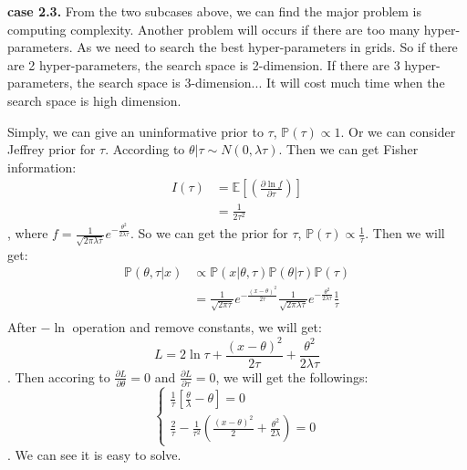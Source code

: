 \documentclass[11pt]{article}
\def\BP{{\bf P}}
\def\BP{{\mathbb P}}
\def\BE{{\mathbb E}}
\begin{document}
\textbf{case 2.3.} From the two subcases above, we can find the major problem is computing complexity. Another problem will occurs if there are too many hyper-parameters. As we need to search the best hyper-parameters in grids. So if there are 2 hyper-parameters, the search space is 2-dimension. If there are 3 hyper-parameters, the search space is 3-dimension... It will cost much time when the search space is high dimension.

Simply, we can give an uninformative prior to $\tau$, $\BP(\tau) \propto 1$. Or we can consider Jeffrey prior for $\tau$. According to $\theta | \tau \sim N(0, \lambda\tau)$. Then we can get Fisher information:
\[\begin{split}
I(\tau) &= \BE[ (\frac{\partial \ln f}{\partial \tau}) ]  \\
&= \frac{1}{2\tau^2}
\end{split}\],
where $f = \frac{1}{\sqrt{2\pi\lambda\tau}} e^{-\frac{\theta^2}{2\lambda\tau}}$. So we can get the prior for $\tau$, $\BP(\tau) \propto \frac{1}{\tau}$. Then we will get:
\[\begin{split}
\BP(\theta, \tau | x) &\propto \BP(x | \theta, \tau) \BP(\theta | \tau) \BP(\tau) \\
&= \frac{1}{\sqrt{2\pi\tau}} e^{-\frac{(x-\theta)^2}{2\tau}} \frac{1}{\sqrt{2\pi\lambda\tau}} e^{-\frac{\theta^2}{2\lambda\tau}} \frac{1}{\tau} \\
\end{split}\]
After $-\ln$ operation and remove constants, we will get:
\[ L = 2\ln\tau + \frac{(x-\theta)^2}{2\tau} + \frac{\theta^2}{2\lambda\tau} \].
Then accoring to $\frac{\partial L}{\partial \theta} = 0$ and $\frac{\partial L}{\partial \tau} = 0$, we will get the followings:
\[\begin{cases}
\frac{1}{\tau} \left[\frac{\theta}{\lambda} - \theta\right] = 0 \\
\frac{2}{\tau} - \frac{1}{\tau^2}\left(\frac{(x-\theta)^2}{2} + \frac{\theta^2}{2\lambda}\right) = 0
\end{cases}\].
We can see it is easy to solve.
\end{document}
